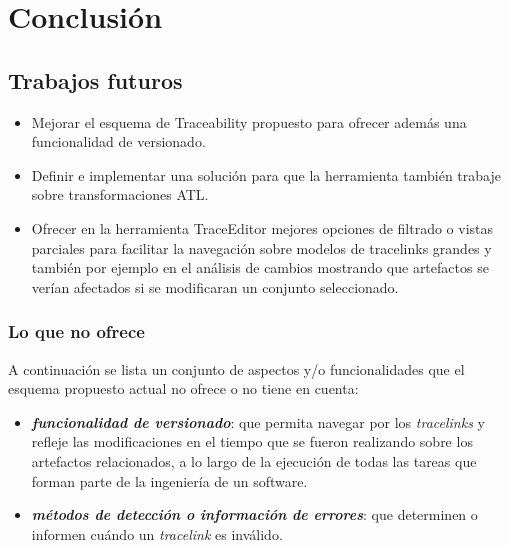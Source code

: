\documentclass[a4paper,12pt,oneside,spanish]{book}
\begin{document}
\chapter{Conclusión}


\section*{Trabajos futuros}

\begin{itemize}

\item Mejorar el esquema de Traceability propuesto para ofrecer además una funcionalidad de versionado.

\item Definir e implementar una solución para que la herramienta también trabaje sobre transformaciones ATL.

\item Ofrecer en la herramienta TraceEditor mejores opciones de filtrado o vistas parciales para facilitar la navegación sobre modelos de tracelinks grandes y también por ejemplo en el análisis de cambios mostrando que artefactos se verían afectados si se modificaran un conjunto seleccionado.
\end{itemize}


\subsection*{Lo que no ofrece}

A continuación se lista un conjunto de aspectos y/o funcionalidades que el esquema propuesto actual no ofrece o no tiene en cuenta:

\begin{itemize}

\item \textbf{\textit{funcionalidad de versionado}}: que permita navegar por los \textit{tracelinks} y refleje las modificaciones en el tiempo que se fueron realizando sobre los artefactos relacionados, a lo largo de la ejecución de todas las tareas que forman parte de la ingeniería de un software.

\item \textbf{\textit{métodos de detección o información de errores}}: que determinen o informen cuándo un \textit{tracelink} es inválido.

\end{itemize}
\end{document}
